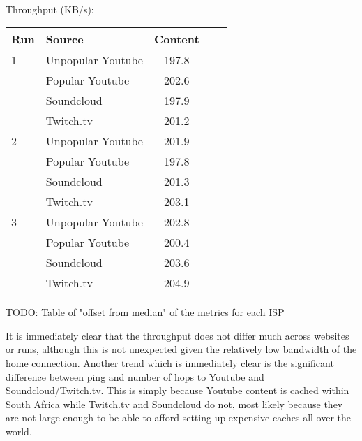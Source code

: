 \documentclass{sig-alternate-05-2015}
\begin{document}
\vspace{1em} \\
Throughput (KB/s): \\
{\small
\begin{tabular}{|l|l|c|c|c|} \hline
Run & Source & Content \\ \hline
1 & Unpopular Youtube & 197.8 \\ \hline
  & Popular Youtube   & 202.6 \\ \hline
  & Soundcloud        & 197.9 \\ \hline
  & Twitch.tv         & 201.2 \\ \hline
2 & Unpopular Youtube & 201.9 \\ \hline
  & Popular Youtube   & 197.8 \\ \hline
  & Soundcloud        & 201.3 \\ \hline
  & Twitch.tv         & 203.1 \\ \hline
3 & Unpopular Youtube & 202.8 \\ \hline
  & Popular Youtube   & 200.4 \\ \hline
  & Soundcloud        & 203.6 \\ \hline
  & Twitch.tv         & 204.9 \\ \hline
\end{tabular}}

\vspace{1em}
TODO: Table of "offset from median" of the metrics for each ISP
\vspace{1em}

It is immediately clear that the throughput does not differ much across websites or runs, although this is not unexpected given the relatively low bandwidth of the home connection. Another trend which is immediately clear is the significant difference between ping and number of hops to Youtube and Soundcloud/Twitch.tv. This is simply because Youtube content is cached within South Africa while Twitch.tv and Soundcloud do not, most likely because they are not large enough to be able to afford setting up expensive caches all over the world.
\end{document}
